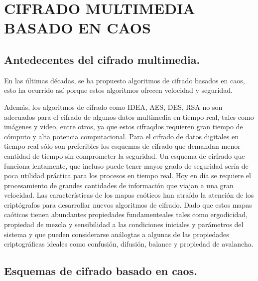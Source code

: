 \documentclass[10pt]{IEEEtran}
\begin{document}
\section{CIFRADO MULTIMEDIA BASADO EN CAOS}
\subsection*{Antedecentes del cifrado multimedia.}
En las últimas décadas, se ha propuesto algoritmos de cifrado basados en caos, esto ha ocurrido así porque estos algoritmos ofrecen velocidad y seguridad.

Además, los algoritmos de cifrado como IDEA, AES, DES, RSA no son adecuados para el cifrado de algunos datos multimedia en tiempo real, tales como imágenes y video, entre otros, ya que estos cifraqdos requieren gran tiempo de cómputo y alta potencia computacional. Para el cifrado de datos digitales en tiempo real sólo son preferibles los esquemas de cifrado que demandan menor cantidad de tiempo sin comprometer la seguridad. Un esquema de cirfrado que funciona lentamente, que incluso puede tener mayor grado de seguridad sería de poca utilidad práctica para los procesos en tiempo real. Hoy en día se requiere el procesamiento de grandes cantidades de información que viajan a una gran velocidad. 
Las características de los mapas caóticos han atraído la atención de los criptógrafos para desarrollar nuevos algoritmos de cifrado. Dado que estos mapas caóticos tienen abundantes propiedades fundamenteales tales como ergodicidad, propiedad de mezcla y sensibilidad a las condiciones iniciales y parámetros del sistema y que pueden considerarse análogtas a algunas de las propiedades criptográficas ideales como confusión, difusión, balance y propiedad de avalancha.
\subsection*{Esquemas de cifrado basado en caos.}
\end{document}
